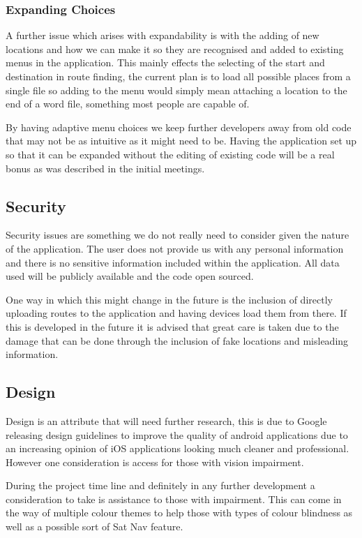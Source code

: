 \documentclass[10pt,a4paper]{article}
\begin{document}
\subsubsection{Expanding Choices}
A further issue which arises with expandability is with the adding of new locations and how we can make it so they are recognised and added to existing menus in the application. This mainly effects the selecting of the start and destination in route finding, the current plan is to load all possible places from a single file so adding to the menu would simply mean attaching a location to the end of a word file, something most people are capable of. 

By having adaptive menu choices we keep further developers away from old code that may not be as intuitive as it might need to be. Having the application set up so that it can be expanded without the editing of existing code will be a real bonus as was described in the initial meetings. 

\subsection{Security}
Security issues are something we do not really need to consider given the nature of the application. The user does not provide us with any personal information and there is no sensitive information included within the application. All data used will be publicly available and the code open sourced. 

One way in which this might change in the future is the inclusion of directly uploading routes to the application and having devices load them from there. If this is developed in the future it is advised that great care is taken due to the damage that can be done through the inclusion of fake locations and misleading information. 

\subsection{Design}
Design is an attribute that will need further research, this is due to Google releasing design guidelines to improve the quality of android applications due to an increasing opinion of iOS applications looking much cleaner and professional. However one consideration is access for those with vision impairment.

During the project time line and definitely in any further development a consideration to take is assistance to those with impairment. This can come in the way of multiple colour themes to help those with types of colour blindness as well as a possible sort of Sat Nav feature.
\end{document}
